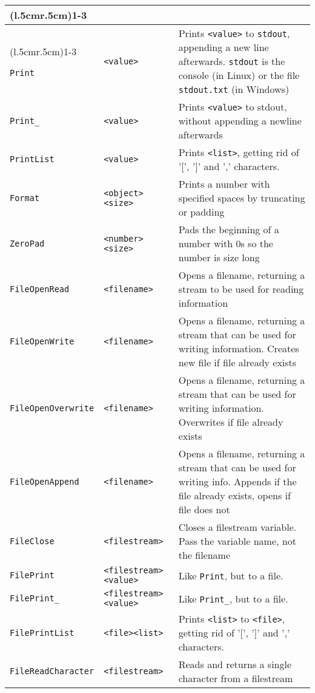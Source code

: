 \begin{longtable}{p{3cm}p{3cm}p{6cm}}
\\
\newpage
\addlinespace[0.2cm] 

\cmidrule(l{.5cm}r{.5cm}){1-3} 
\multicolumn{3}{c}{\textbf{File/Network/Device Functions}}\\ 
\cmidrule(l{.5cm}r{.5cm}){1-3} 

\verb+Print+ &\verb+<value>+ &Prints \verb+<value>+ to \texttt{stdout}, appending a new line afterwards. \texttt{stdout} is the console (in Linux) or the file \texttt{stdout.txt} (in Windows)\\ 
\verb+Print_+ &\verb+<value>+ &Prints \verb+<value>+ to stdout, without appending a newline afterwards\\ 
\verb+PrintList+&\verb+<value>+ &Prints \verb+<list>+, getting rid of '[', ']' and ',' characters.\\ 
\verb+Format+ &\verb+<object>+ \verb+<size>+ &Prints a number with specified spaces by truncating or padding \\ 
\verb+ZeroPad+ &\verb+<number>+ \verb+<size>+ &Pads the beginning of a number with 0s so the number is size long\\
\verb+FileOpenRead+ &\verb+<filename>+ &Opens a filename, returning a stream to be used for reading information\\ 
\verb+FileOpenWrite+ &\verb+<filename>+ &Opens a filename, returning a stream that can be used for writing information. Creates new file if file already exists\\ 
\verb+FileOpenOverwrite+ &\verb+<filename>+ &Opens a filename, returning a stream that can be used for writing information. Overwrites if file already exists\\ 
\verb+FileOpenAppend+ &\verb+<filename>+ &Opens a filename, returning a stream that can be used for writing info. Appends if the file already exists, opens if file does not\\ 
\verb+FileClose+ &\verb+<filestream>+&Closes a filestream variable. Pass the variable name, not the filename\\ 
\verb+FilePrint+ &\verb+<filestream>+ \verb+<value>+ &Like \verb+Print+, but to a file.\\ 
\verb+FilePrint_+ &\verb+<filestream>+ \verb+<value>+ &Like \verb+Print_+, but to a file.\\ 
\verb+FilePrintList+&\verb+<file>+\verb+<list>+ &Prints \verb+<list>+ to \verb+<file>+, getting rid of '[', ']' and ',' characters.\\ 
\verb+FileReadCharacter+ &\verb+<filestream>+ &Reads and returns a single character from a filestream\\ 

\end{longtable}
